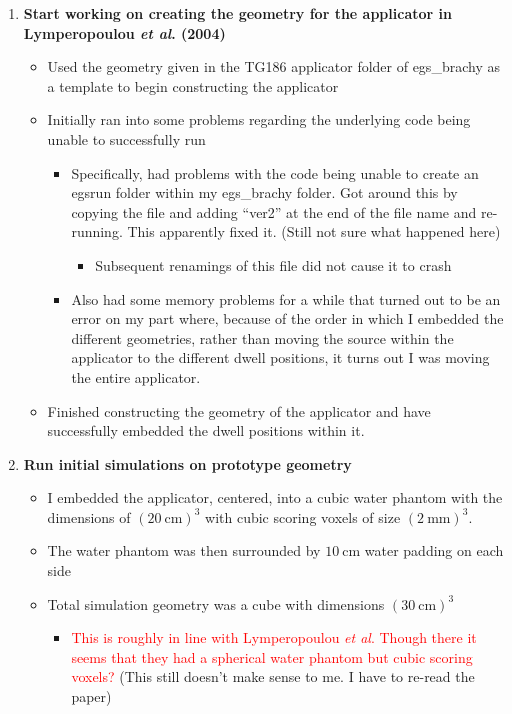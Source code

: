 \documentclass[12pt]{article}
\begin{document}
\begin{enumerate}
	\item \textbf{Start working on creating the geometry for the applicator in Lymperopoulou \textit{et al}. (2004)}
	\begin{itemize}
		\item Used the geometry given in the TG186 applicator folder of egs\_brachy as a template to begin constructing the applicator
		\item Initially ran into some problems regarding the underlying code being unable to successfully run
		\begin{itemize}
			\item Specifically, had problems with the code being unable to create an egsrun folder within my egs\_brachy folder. Got around this by copying the file and adding ``ver2'' at the end of the file name and re-running. This apparently fixed it. (Still not sure what happened here)
			\begin{itemize}
				\item Subsequent renamings of this file did not cause it to crash
			\end{itemize}
			\item Also had some memory problems for a while that turned out to be an error on my part where, because of the order in which I embedded the different geometries, rather than moving the  source within the applicator to the different dwell positions, it turns out I was moving the entire applicator.
		\end{itemize}
		\item Finished constructing the geometry of the applicator and have successfully embedded the  dwell positions within it.
	\end{itemize}
	\item \textbf{Run initial simulations on prototype geometry}
	\begin{itemize}
		\item I embedded the applicator, centered, into a cubic water phantom with the dimensions of $ \left(20\ \si{\centi\meter}\right)^{3} $ with cubic scoring voxels of size $ \left(2\ \si{\milli\meter}\right)^{3} $.
		\item The water phantom was then surrounded by $ 10\ \si{\centi\meter} $ water padding on each side 
		\item Total simulation geometry was a cube with dimensions $ \left(30\ \si{\centi\meter}\right)^{3} $
		\begin{itemize}
			\item \textcolor{Red}{This is roughly in line with Lymperopoulou \textit{et al}. Though there it seems that they had a spherical water phantom but cubic scoring voxels?} (This still doesn't make sense to me. I have to re-read the paper)

\end{itemize}
\end{itemize}
\end{enumerate}
\end{document}
